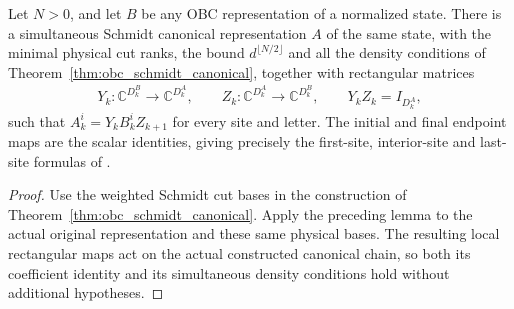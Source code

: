 \begin{theorem}
    \label{thm:obc_rectangular_canonical_freedom}
    \leanok
    Let $N>0$, and let $B$ be any OBC representation of a normalized
    state. There is a simultaneous Schmidt canonical representation $A$
    of the same state, with the minimal physical cut ranks, the bound
    $d^{\lfloor N/2\rfloor}$ and all the density conditions of
    Theorem~\ref{thm:obc_schmidt_canonical}, together with rectangular
    matrices
    \begin{align}
        Y_k:\mathbb C^{D_k^B}\longrightarrow\mathbb C^{D_k^A},
        \qquad
        Z_k:\mathbb C^{D_k^A}\longrightarrow\mathbb C^{D_k^B},
        \qquad Y_kZ_k=I_{D_k^A},
    \end{align}
    such that $A_k^i=Y_kB_k^iZ_{k+1}$ for every site and letter.
    The initial and final endpoint maps are the scalar identities,
    giving precisely the first-site, interior-site and last-site
    formulas of \cite[Theorem~2]{PerezGarcia2007Matrix}.
\end{theorem}
\begin{proof}
    \leanok
    Use the weighted Schmidt cut bases in the construction of
    Theorem~\ref{thm:obc_schmidt_canonical}. Apply the preceding lemma to
    the actual original representation and these same physical bases.
    The resulting local rectangular maps act on the actual constructed
    canonical chain, so both its coefficient identity and its simultaneous
    density conditions hold without additional hypotheses.
\end{proof}

